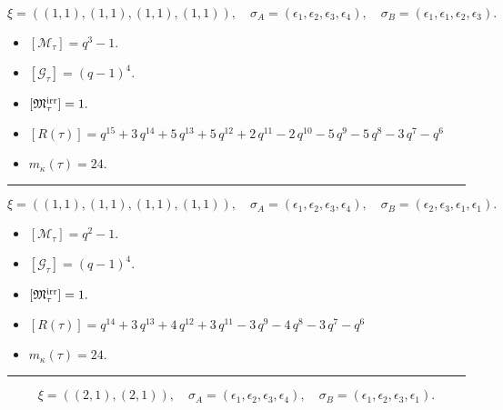 \documentclass[10pt,a4paper]{amsart}
\begin{document}
$$\xi = ({(1, 1), (1, 1), (1, 1)}, {(1, 1)}),\quad \sigma_A = ({{\epsilon_1}, {\epsilon_2}, {\epsilon_3}}, {{\epsilon_4}}),\quad \sigma_B = ({{\epsilon_1}, {\epsilon_1}, {\epsilon_2}}, {{\epsilon_3}}).$$

\begin{itemize}
 \item $[\mathcal{M}_{\tau}] = q^{3} - 1 .$

 \item $[\mathcal{G}_{\tau}] = {\left(q - 1\right)}^{4} .$

 \item $[{\frak M}_{\tau}^{\textrm{irr}}] = 1 .$

 \item $[R(\tau)] = q^{15} + 3 \, q^{14} + 5 \, q^{13} + 5 \, q^{12} + 2 \, q^{11} - 2 \, q^{10} - 5 \, q^{9} - 5 \, q^{8} - 3 \, q^{7} - q^{6} $

 \item $m_{\kappa}(\tau) = 24 .$

 \end{itemize}
\noindent\rule{8cm}{0.4pt}

$$\xi = ({(1, 1), (1, 1), (1, 1)}, {(1, 1)}),\quad \sigma_A = ({{\epsilon_1}, {\epsilon_2}, {\epsilon_3}}, {{\epsilon_4}}),\quad \sigma_B = ({{\epsilon_2}, {\epsilon_3}, {\epsilon_1}}, {{\epsilon_1}}).$$

\begin{itemize}
 \item $[\mathcal{M}_{\tau}] = q^{2} - 1 .$

 \item $[\mathcal{G}_{\tau}] = {\left(q - 1\right)}^{4} .$

 \item $[{\frak M}_{\tau}^{\textrm{irr}}] = 1 .$

 \item $[R(\tau)] = q^{14} + 3 \, q^{13} + 4 \, q^{12} + 3 \, q^{11} - 3 \, q^{9} - 4 \, q^{8} - 3 \, q^{7} - q^{6} $

 \item $m_{\kappa}(\tau) = 24 .$

 \end{itemize}
\noindent\rule{8cm}{0.4pt}

$$\xi = ({(2, 1)}, {(2, 1)}),\quad \sigma_A = ({{\epsilon_1, \epsilon_2}}, {{\epsilon_3, \epsilon_4}}),\quad \sigma_B = ({{\epsilon_1, \epsilon_2}}, {{\epsilon_3, \epsilon_1}}).$$
\end{document}
